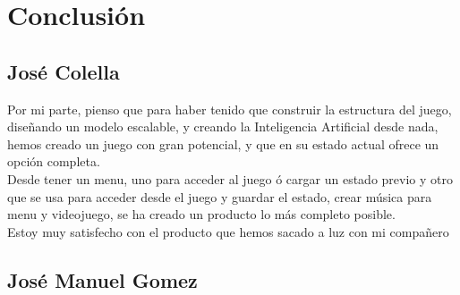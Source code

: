 \documentclass{article}
\begin{document}
\section{Conclusión}

\subsection{José Colella}

Por mi parte, pienso que para haber tenido que construir la estructura del juego,
diseñando un modelo escalable, y creando la Inteligencia Artificial desde nada,
hemos creado un juego con gran potencial, y que en su estado actual ofrece un opción
completa. \hfill \\
Desde tener un menu, uno para acceder al juego ó cargar un estado previo y otro
que se usa para acceder desde el juego y guardar el estado, crear música para menu y
videojuego, se ha creado un producto lo más completo posible. \\
Estoy muy satisfecho con el producto que hemos sacado a luz con mi compañero

\subsection{José Manuel Gomez}
\end{document}
